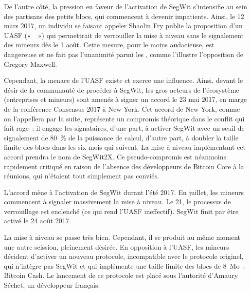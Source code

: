 De l'autre côté, la pression en faveur de l'activation de SegWit s'intensifie au sein des partisans des petits blocs, qui commencent à devenir impatients. Ainsi, le 12 mars 2017, un individu se faisant appeler Shaolin Fry publie la proposition d'un UASF («~~») qui permettrait de verrouiller la mise à niveau sans le signalement des mineurs dès le 1\ier{} août. Cette mesure, pour le moins audacieuse, est dangereuse et ne fait pas l'unanimité parmi les , comme l'illustre l'opposition de Gregory Maxwell.

Cependant, la menace de l'UASF existe et exerce une influence. Ainsi, devant le désir de la communauté de procéder à SegWit, les gros acteurs de l'écosystème (entreprises et mineurs) sont amenés à signer un accord le 23 mai 2017, en marge de la conférence Consensus 2017 à New York. Cet accord de New York, comme on l'appellera par la suite, représente un compromis théorique dans le conflit qui fait rage~: il engage les signataires, d'une part, à activer SegWit avec un seuil de signalement de 80~\% de la puissance de calcul, d'autre part, à doubler la taille limite des blocs dans les six mois qui suivent. La mise à niveau implémentant cet accord prendra le nom de SegWit2X. Ce pseudo-compromis est néanmoins rapidement critiqué en raison de l'absence des développeurs de Bitcoin Core à la réunions, qui n'étaient tout simplement pas conviés.

L'accord mène à l'activation de SegWit durant l'été 2017. En juillet, les mineurs commencent à signaler massivement la mise à niveau. Le 21, le processus de verrouillage est enclenché (ce qui rend l'UASF ineffectif). SegWit finit par être activé le 24 août 2017.

La mise à niveau se passe très bien. Cependant, il se produit au même moment une autre scission, pleinement désirée. En opposition à l'UASF, les mineurs décident d'activer un nouveau protocole, incompatible avec le protocole originel, qui n'intègre pas SegWit et qui implémente une taille limite des blocs de 8~Mo~: Bitcoin Cash. Le lancement de ce protocole est placé sous l'autorité d'Amaury Séchet, un développeur français.

